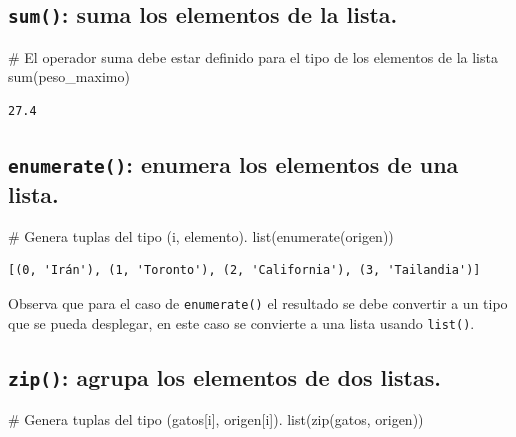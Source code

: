 \documentclass[
  spanish,
  letterpaper,
]{scrbook}
\newenvironment{Shaded}{\begin{snugshade}}{\end{snugshade}}
\newcommand{\BuiltInTok}[1]{\textcolor[rgb]{0.00,0.23,0.31}{#1}}
\newcommand{\CommentTok}[1]{\textcolor[rgb]{0.37,0.37,0.37}{#1}}
\newcommand{\NormalTok}[1]{\textcolor[rgb]{0.00,0.23,0.31}{#1}}
\theoremstyle{definition}
\theoremstyle{remark}
\begin{document}
\subsection{\texorpdfstring{\texttt{sum()}: suma los elementos de la
lista.}{sum(): suma los elementos de la lista.}}\label{sum-suma-los-elementos-de-la-lista.}

\begin{Shaded}
\begin{Highlighting}[]
\CommentTok{\# El operador suma debe estar definido para el tipo de los elementos de la lista}
\BuiltInTok{sum}\NormalTok{(peso\_maximo) }
\end{Highlighting}
\end{Shaded}

\begin{verbatim}
27.4
\end{verbatim}

\subsection{\texorpdfstring{\texttt{enumerate()}: enumera los elementos
de una
lista.}{enumerate(): enumera los elementos de una lista.}}\label{enumerate-enumera-los-elementos-de-una-lista.}

\begin{Shaded}
\begin{Highlighting}[]
\CommentTok{\# Genera tuplas del tipo \textasciigrave{}(i, elemento)\textasciigrave{}.}
\BuiltInTok{list}\NormalTok{(}\BuiltInTok{enumerate}\NormalTok{(origen)) }
\end{Highlighting}
\end{Shaded}

\begin{verbatim}
[(0, 'Irán'), (1, 'Toronto'), (2, 'California'), (3, 'Tailandia')]
\end{verbatim}

Observa que para el caso de \texttt{enumerate()} el resultado se debe
convertir a un tipo que se pueda desplegar, en este caso se convierte a
una lista usando \texttt{list()}.

\subsection{\texorpdfstring{\texttt{zip()}: agrupa los elementos de dos
listas.}{zip(): agrupa los elementos de dos listas.}}\label{zip-agrupa-los-elementos-de-dos-listas.}

\begin{Shaded}
\begin{Highlighting}[]
\CommentTok{\# Genera tuplas del tipo \textasciigrave{}(gatos[i], origen[i])\textasciigrave{}.}
\BuiltInTok{list}\NormalTok{(}\BuiltInTok{zip}\NormalTok{(gatos, origen)) }
\end{Highlighting}
\end{Shaded}
\end{document}
